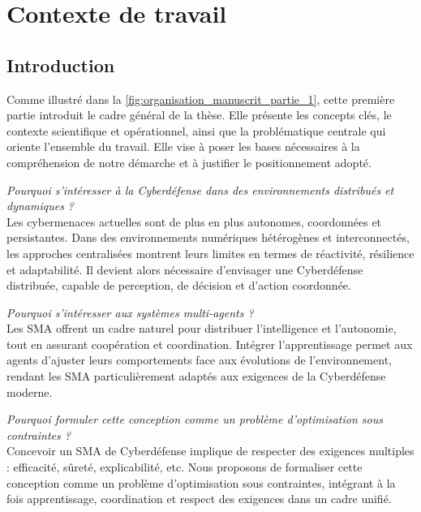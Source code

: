 \cleardoublepage
{}
\part{Contexte de travail}
\label{part:contexte}

\chapter*{Introduction}

Comme illustré dans la \autoref{fig:organisation_manuscrit_partie_1}, cette première partie introduit le cadre général de la thèse. Elle présente les concepts clés, le contexte scientifique et opérationnel, ainsi que la problématique centrale qui oriente l'ensemble du travail. Elle vise à poser les bases nécessaires à la compréhension de notre démarche et à justifier le positionnement adopté.

\vspace{1em}

\noindent \textit{Pourquoi s'intéresser à la Cyberdéfense dans des environnements distribués et dynamiques ?}\\
Les cybermenaces actuelles sont de plus en plus autonomes, coordonnées et persistantes. Dans des environnements numériques hétérogènes et interconnectés, les approches centralisées montrent leurs limites en termes de réactivité, résilience et adaptabilité. Il devient alors nécessaire d'envisager une Cyberdéfense distribuée, capable de perception, de décision et d'action coordonnée.

\vspace{0.5em}

\noindent \textit{Pourquoi s'intéresser aux systèmes multi-agents ?}\\
Les \ac{SMA} offrent un cadre naturel pour distribuer l'intelligence et l'autonomie, tout en assurant coopération et coordination. Intégrer l'apprentissage permet aux agents d'ajuster leurs comportements face aux évolutions de l'environnement, rendant les \ac{SMA} particulièrement adaptés aux exigences de la Cyberdéfense moderne.

\vspace{0.5em}

\noindent \textit{Pourquoi formuler cette conception comme un problème d'optimisation sous contraintes ?}\\
Concevoir un \ac{SMA} de Cyberdéfense implique de respecter des exigences multiples : efficacité, sûreté, explicabilité, etc. Nous proposons de formaliser cette conception comme un problème d'optimisation sous contraintes, intégrant à la fois apprentissage, coordination et respect des exigences dans un cadre unifié.

